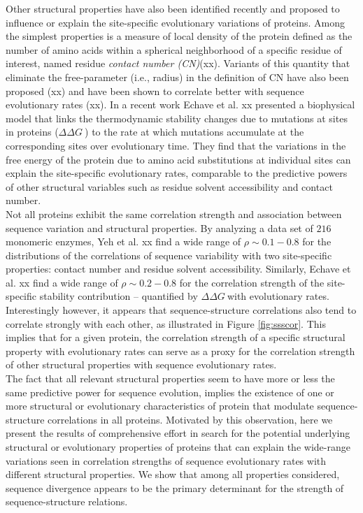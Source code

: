 \documentclass[11pt]{article}
\newcommand{\ddg}{$\Delta\Delta G~$}
\begin{document}
    Other structural properties have also been identified recently and proposed to influence or explain the site-specific evolutionary variations of proteins. Among the simplest properties is a measure of local density of the protein defined as the number of amino acids within a spherical neighborhood of a specific residue of interest, named residue {\it contact number (CN)}(xx). Variants of this quantity that eliminate the free-parameter (i.e., radius) in the definition of CN have also been proposed (xx) and have been shown to correlate better with sequence evolutionary rates (xx). In a recent work Echave et al. xx presented a biophysical model that links the thermodynamic stability changes due to mutations at sites in proteins (\ddg) to the rate at which mutations accumulate at the corresponding sites over evolutionary time. They find that the variations in the free energy of the protein due to amino acid substitutions at individual sites can explain the site-specific evolutionary rates, comparable to the predictive powers of other structural variables such as residue solvent accessibility and contact number.
    \\

    Not all proteins exhibit the same correlation strength and association between sequence variation and structural properties. By analyzing a data set of $216$ monomeric enzymes, Yeh et al. xx find a wide range of $\rho\sim0.1-0.8$ for the distributions of the correlations of sequence variability with two site-specific properties: contact number and residue solvent accessibility. Similarly, Echave et al. xx find a wide range of $\rho\sim0.2-0.8$ for the correlation strength of the site-specific stability contribution -- quantified by \ddg with evolutionary rates. Interestingly however, it appears that sequence-structure correlations also tend to correlate strongly with each other, as illustrated in Figure \ref{fig:ssscor}. This implies that for a given protein, the correlation strength of a specific structural property with evolutionary rates can serve as a proxy for the correlation strength of other structural properties with sequence evolutionary rates.
    \\

    The fact that all relevant structural properties seem to have more or less the same predictive power for sequence evolution, implies the existence of one or more structural or evolutionary characteristics of protein that modulate sequence-structure correlations in all proteins. Motivated by this observation, here we present the results of comprehensive effort in search for the potential underlying structural or evolutionary properties of proteins that can explain the wide-range variations seen in correlation strengths of sequence evolutionary rates with different structural properties.  We show that among all properties considered, sequence divergence appears to be the primary determinant for the strength of sequence-structure relations.
    \\
\end{document}
